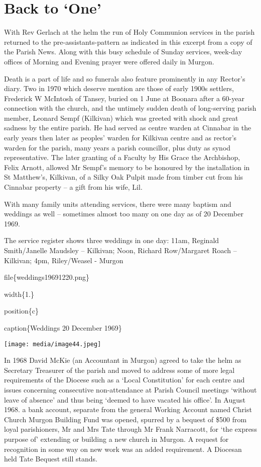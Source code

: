 \hypertarget{back-to-one}{%
\section{Back to `One'}\label{back-to-one}}

With Rev Gerlach at the helm the run of Holy Communion services in the parish returned to the pre-assistants-pattern as indicated in this excerpt from a copy of the Parish News. Along with this busy schedule of Sunday services, week-day offices of Morning and Evening prayer were offered daily in Murgon.

Death is a part of life and so funerals also feature prominently in any Rector's diary. Two in 1970 which deserve mention are those of early 1900s settlers, Frederick W McIntosh of Tansey, buried on 1 June at Boonara after a 60-year connection with the church, and the untimely sudden death of long-serving parish member, Leonard Sempf (Kilkivan) which was greeted with shock and great sadness by the entire parish. He had served as centre warden at Cinnabar in the early years then later as peoples' warden for Kilkivan centre and as rector's warden for the parish, many years a parish councillor, plus duty as synod representative. The later granting of a Faculty by His Grace the Archbishop, Felix Arnott, allowed Mr Sempf's memory to be honoured by the installation in St Matthew's, Kilkivan, of a Silky Oak Pulpit made from timber cut from his Cinnabar property -- a gift from his wife, Lil.

With many family units attending services, there were many baptism and weddings as well -- sometimes almost too many on one day as of 20 December 1969.

The service register shows three weddings in one day: 11am, Reginald Smith/Janelle Maudsley -- Kilkivan; Noon, Richard Row/Margaret Roach -- Kilkivan; 4pm, Riley/Weasel - Murgon

file\{weddings19691220.png\}

width\{1.\}

position\{c\}

caption\{Weddings 20 December 1969\}

\texttt{[image: media/image44.jpeg]}

In 1968 David McKie (an Accountant in Murgon) agreed to take the helm as Secretary Treasurer of the parish and moved to address some of more legal requirements of the Diocese such as a `Local Constitution' for each centre and issues concerning consecutive non-attendance at Parish Council meetings `without leave of absence' and thus being `deemed to have vacated his office'. In August 1968. a bank account, separate from the general Working Account named Christ Church Murgon Building Fund was opened, spurred by a bequest of \$500 from loyal parishioners, Mr and Mrs Tate through Mr Frank Narracott, for `the express purpose of' extending or building a new church in Murgon. A request for recognition in some way on new work was an added requirement. A Diocesan held Tate Bequest still stands.

